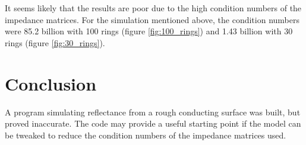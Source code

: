 \documentclass[etd,twoside,senior,noacknowledgments]{BYUPhys}
\begin{document}
It seems likely that the results are poor due to the high condition numbers of the impedance matrices. For the simulation mentioned above, the condition numbers were 85.2 billion with 100 rings (figure \ref{fig:100_rings}) and 1.43 billion with 30 rings (figure \ref{fig:30_rings}).







\chapter{Conclusion}\label{chap:conclusion}

A program simulating reflectance from a rough conducting surface was built, but proved inaccurate. The code may provide a useful starting point if the model can be tweaked to reduce the condition numbers of the impedance matrices used.






\end{document}
